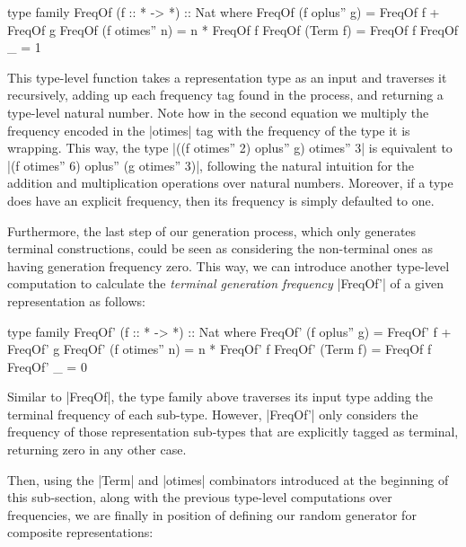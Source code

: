 \begin{code}
type family FreqOf (f :: * -> *) :: Nat where
  FreqOf (f oplus'' g)   = FreqOf f + FreqOf g
  FreqOf (f otimes'' n)  = n * FreqOf f
  FreqOf (Term f)        = FreqOf f
  FreqOf _               = 1
\end{code}
%
This type-level function takes a representation type as an input and traverses
it recursively, adding up each frequency tag found in the process, and returning
a type-level natural number.
%
Note how in the second equation we multiply the frequency encoded in the
|otimes| tag with the frequency of the type it is wrapping.
%
This way, the type |((f otimes'' 2) oplus'' g) otimes'' 3| is equivalent to |(f
otimes'' 6) oplus'' (g otimes'' 3)|, following the natural intuition for the
addition and multiplication operations over natural numbers.
%
Moreover, if a type does have an explicit frequency, then its frequency is
simply defaulted to one.


Furthermore, the last step of our generation process, which only generates
terminal constructions, could be seen as considering the non-terminal ones as
having generation frequency zero.
%
This way, we can introduce another type-level computation to calculate the
\emph{terminal generation frequency} |FreqOf'| of a given representation as
follows:

\begin{code}
type family FreqOf' (f :: * -> *) :: Nat where
  FreqOf' (f oplus'' g)   = FreqOf' f  +  FreqOf' g
  FreqOf' (f otimes'' n)  = n  *  FreqOf' f
  FreqOf' (Term f)        = FreqOf f
  FreqOf' _               = 0
\end{code}
%
Similar to |FreqOf|, the type family above traverses its input type adding the
terminal frequency of each sub-type.
%
However, |FreqOf'| only considers the frequency of those representation
sub-types that are explicitly tagged as terminal, returning zero in any other
case.


Then, using the |Term| and |otimes| combinators introduced at the beginning of
this sub-section, along with the previous type-level computations over
frequencies, we are finally in position of defining our random generator for
composite representations:

